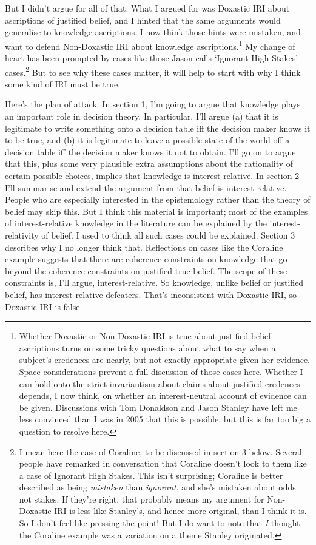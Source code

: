 \documentclass[11pt,oneside]{book}
\begin{document}
\noindent But I didn't argue for all of that. What I argued for was Doxastic IRI about ascriptions of justified belief, and I hinted that the same arguments would generalise to knowledge ascriptions. I now think those hints were mistaken, and want to defend Non-Doxastic IRI about knowledge ascriptions.\footnote{Whether Doxastic or Non-Doxastic IRI is true about justified belief ascriptions turns on some tricky questions about what to say when a subject's credences are nearly, but not exactly appropriate given her evidence. Space considerations prevent a full discussion of those cases here. Whether I can hold onto the strict invariantism about claims about justified credences depends, I now think, on whether an interest-neutral account of evidence can be given. Discussions with Tom Donaldson and Jason Stanley have left me less convinced than I was in 2005 that this is possible, but this is far too big a question to resolve here.} My change of heart has been prompted by cases like those Jason \cite{Stanley2005-STAKAP} calls `Ignorant High Stakes' cases.\footnote{I mean here the case of Coraline, to be discussed in section 3 below. Several people have remarked in conversation that Coraline doesn't look to them like a case of Ignorant High Stakes. This isn't surprising; Coraline is better described as being \textit{mistaken} than \textit{ignorant}, and she's mistaken about odds not stakes. If they're right, that probably means my argument for Non-Doxastic IRI is less like Stanley's, and hence more original, than I think it is. So I don't feel like pressing the point! But I do want to note that \textit{I} thought the Coraline example was a variation on a theme Stanley originated.} But to see why these cases matter, it will help to start with why I think some kind of IRI must be true. 

Here's the plan of attack. In section 1, I'm going to argue that knowledge plays an important role in decision theory. In particular, I'll argue (a) that it is legitimate to write something onto a decision table iff the decision maker knows it to be true, and (b) it is legitimate to leave a possible state of the world off a decision table iff the decision maker knows it not to obtain. I'll go on to argue that this, plus some very plausible extra assumptions about the rationality of certain possible choices, implies that knowledge is interest-relative. In section 2 I'll summarise and extend the argument from \cite{Weatherson2005-WEACWD} that belief is interest-relative. People who are especially interested in the epistemology rather than the theory of belief may skip this. But I think this material is important; most of the examples of interest-relative knowledge in the literature can be explained by the interest-relativity of belief. I used to think all such cases could be explained. Section 3 describes why I no longer think that. Reflections on cases like the Coraline example suggests that there are coherence constraints on knowledge that go beyond the coherence constraints on justified true belief. The scope of these constraints is, I'll argue, interest-relative. So knowledge, unlike belief or justified belief, has interest-relative defeaters. That's inconsistent with Doxastic IRI, so Doxastic IRI is false.
\end{document}
